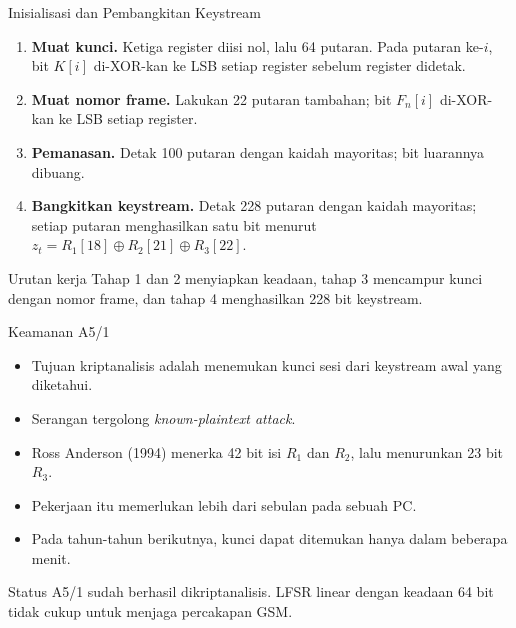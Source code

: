 \documentclass[aspectratio=169,11pt]{beamer}
\begin{document}
\begin{frame}{Inisialisasi dan Pembangkitan Keystream}
    \footnotesize
    \begin{enumerate}
        \item \textbf{Muat kunci.} Ketiga register diisi nol, lalu 64 putaran.
              Pada putaran ke-$i$, bit $K[i]$ di-XOR-kan ke LSB setiap
              register sebelum register didetak.
        \item \textbf{Muat nomor frame.} Lakukan 22 putaran tambahan; bit
              $F_n[i]$ di-XOR-kan ke LSB setiap register.
        \item \textbf{Pemanasan.} Detak 100 putaran dengan kaidah mayoritas;
              bit luarannya dibuang.
        \item \textbf{Bangkitkan keystream.} Detak 228 putaran dengan kaidah
              mayoritas; setiap putaran menghasilkan satu bit menurut
              $z_t=R_1[18]\oplus R_2[21]\oplus R_3[22]$.
    \end{enumerate}
    \vspace{0.1cm}
    \begin{block}{Urutan kerja}
        Tahap 1 dan 2 menyiapkan keadaan, tahap 3 mencampur kunci dengan
        nomor frame, dan tahap 4 menghasilkan 228 bit keystream.
    \end{block}
\end{frame}

\begin{frame}{Keamanan A5/1}
    \footnotesize
    \begin{itemize}
        \item Tujuan kriptanalisis adalah menemukan kunci sesi dari
              keystream awal yang diketahui.
        \item Serangan tergolong \textit{known-plaintext attack}.
        \item Ross Anderson (1994) menerka 42 bit isi $R_1$ dan $R_2$,
              lalu menurunkan 23 bit $R_3$.
        \item Pekerjaan itu memerlukan lebih dari sebulan pada sebuah PC.
        \item Pada tahun-tahun berikutnya, kunci dapat ditemukan hanya
              dalam beberapa menit.
    \end{itemize}
    \begin{alertblock}{Status}
        A5/1 sudah berhasil dikriptanalisis. LFSR linear dengan keadaan
        64 bit tidak cukup untuk menjaga percakapan GSM.
    \end{alertblock}
\end{frame}
\end{document}
